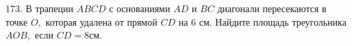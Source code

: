 173. В трапеции $ABCD$ с основаниями $AD$ и $BC$ диагонали пересекаются в точке $O,$ которая удалена от прямой $CD$ на 6 см. Найдите площадь треугольника $AOB,$ если $CD=8$см.\\
